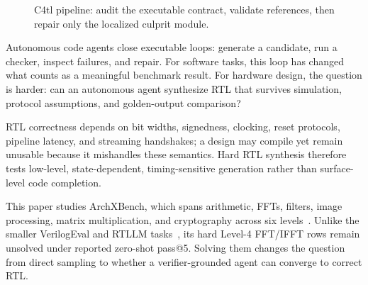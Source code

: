 \documentclass[sigconf,anonymous]{acmart}
\newcommand{\arch}{ArchXBench\xspace}
\newcommand{\cFourTL}{C4tl\xspace}
\begin{document}
\begin{figure}[t]
{
}
\caption{\cFourTL pipeline: audit the executable contract, validate references, then repair only the localized culprit module.}
\label{fig:pipeline}
\vspace{-0.45\baselineskip}
\end{figure}

Autonomous code agents close executable loops: generate a candidate, run a checker, inspect failures, and repair.
For software tasks, this loop has changed what counts as a meaningful benchmark result.
For hardware design, the question is harder: can an autonomous agent synthesize RTL that survives simulation, protocol assumptions, and golden-output comparison?

RTL correctness depends on bit widths, signedness, clocking, reset protocols, pipeline latency, and streaming handshakes; a design may compile yet remain unusable because it mishandles these semantics.
Hard RTL synthesis therefore tests low-level, state-dependent, timing-sensitive generation rather than surface-level code completion.

This paper studies \arch, which spans arithmetic, FFTs, filters, image processing, matrix multiplication, and cryptography across six levels~\cite{purini2025archxbench}.
Unlike the smaller VerilogEval and RTLLM tasks~\cite{liu2023verilogeval,lu2023rtllm}, its hard Level-4 FFT/IFFT rows remain unsolved under reported zero-shot pass@5.
Solving them changes the question from direct sampling to whether a verifier-grounded agent can converge to correct RTL.
\end{document}
